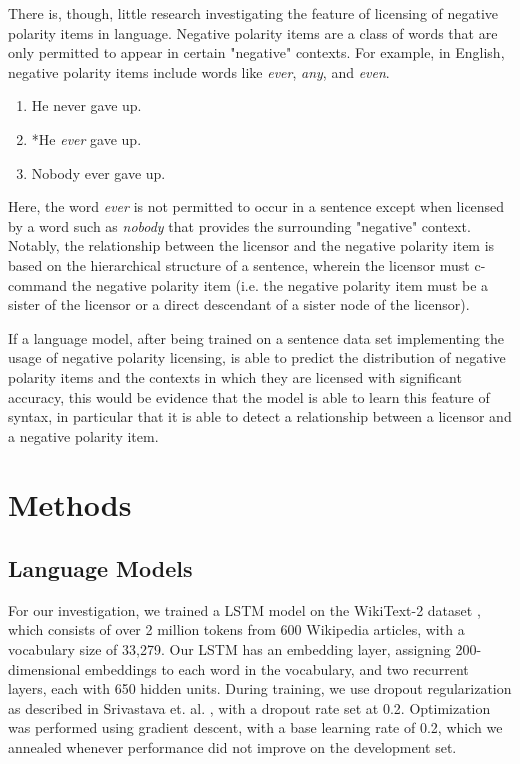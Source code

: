 \documentclass[11pt, round]{article}
\begin{document}
There is, though, little research investigating the feature of licensing of negative polarity items in language. Negative polarity items are a class of words that are only permitted to appear in certain "negative" contexts. For example, in English, negative polarity items include words like \textit{ever}, \textit{any}, and \textit{even}.
\begin{enumerate}
    \item He never gave up.
    \item *He \textit{ever} gave up.
    \item Nobody ever gave up.
\end{enumerate}
Here, the word \textit{ever} is not permitted to occur in a sentence except when licensed by a word such as \textit{nobody} that provides the surrounding "negative" context. Notably, the relationship between the licensor and the negative polarity item is based on the hierarchical structure of a sentence, wherein the licensor must c-command the negative polarity item (i.e. the negative polarity item must be a sister of the licensor or a direct descendant of a sister node of the licensor).

If a language model, after being trained on a sentence data set implementing the usage of negative polarity licensing, is able to predict the distribution of negative polarity items and the contexts in which they are licensed with significant accuracy, this would be evidence that the model is able to learn this feature of syntax, in particular that it is able to detect a relationship between a licensor and a negative polarity item.

\section{Methods}
\subsection{Language Models}

For our investigation, we trained a LSTM model on the WikiText-2 dataset \cite{merity2016pointer}, which consists of over 2 million tokens from 600 Wikipedia articles, with a vocabulary size of 33,279. Our LSTM has an embedding layer, assigning 200-dimensional embeddings to each word in the vocabulary, and two recurrent layers, each with 650 hidden units. During training, we use dropout regularization as described in Srivastava et. al. , with a dropout rate set at 0.2. Optimization was performed using gradient descent, with a base learning rate of 0.2, which we annealed whenever performance did not improve on the development set.
\end{document}

